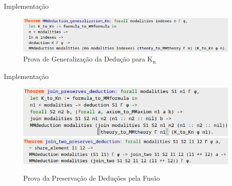 \documentclass[xcolor=table]{beamer}
\begin{document}
    \begin{frame}{Implementação}
        \begin{adjustwidth}{-.7cm}{}
            \begin{figure}[htbp]
                \centering
                \includegraphics[scale=.5]{ProvaGeneralizacaoDerivacaoKMM.png}
                \caption{Prova de Generalização da Dedução para K\textsubscript{n}}
            \end{figure}
        \end{adjustwidth}
    \end{frame}

    \begin{frame}{Implementação}
        \begin{adjustwidth}{0cm}{}
            \begin{figure}[htbp]
                \centering
                \begin{flushleft}
                    \includegraphics[scale=.5]{Figuras/ProvaJoinPreservaDeducao.png}
                    \includegraphics[scale=.5]{Figuras/ProvaJoinTwoPreservaDeducao.png}
                \end{flushleft}
                \caption{Prova da Preservação de Deduções pela Fusão}
            \end{figure}
        \end{adjustwidth}
    \end{frame}
\end{document}
